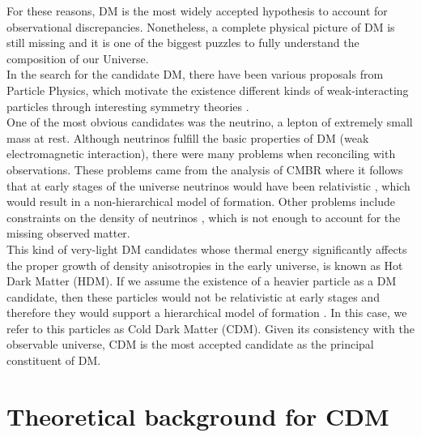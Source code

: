 For these reasons, DM is the most widely accepted hypothesis to account for observational discrepancies. Nonetheless, a complete physical picture of DM is still missing and it is one of the biggest puzzles to fully understand the composition of our Universe.\\

In the search for the candidate DM, there have been various proposals from Particle Physics, which motivate the existence different kinds of weak-interacting particles through interesting symmetry theories \cite{Kim_1987,Bertone_et_al._2005}.\\

One of the most obvious candidates was the neutrino, a lepton of extremely small mass at rest. Although neutrinos fulfill the basic properties of DM (weak electromagnetic interaction), there were many problems when reconciling with observations. These problems came from the analysis of CMBR where it follows that at early stages of the universe neutrinos would have been relativistic \cite{Bond_et_al._1980,Bertone_et_al._2005}, which would result in a non-hierarchical model of formation. Other problems include constraints on the density of neutrinos \cite{WMAP_2003}, which is not enough to account for the missing observed matter.\\

This kind of very-light DM candidates whose thermal energy significantly affects the proper growth of density anisotropies in the early universe, is known as Hot Dark Matter (HDM). If we assume the existence of a heavier particle as a DM candidate, then these particles would not be relativistic at early stages and therefore they would support a hierarchical model of formation \cite{Blumenthal_et_al._1984,Liddle_and_Lith_1993}. In this case, we refer to this particles as Cold Dark Matter (CDM). Given its consistency with the observable universe, CDM is the most accepted candidate as the principal constituent of DM.\\

\section{Theoretical background for CDM}

